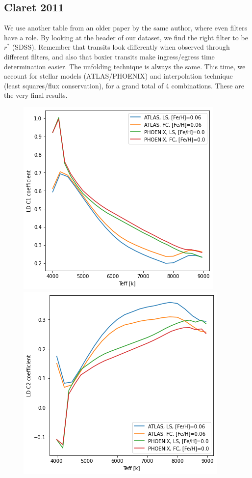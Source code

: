 \documentclass[a4paper,11pt,twocolumn]{article}
\begin{document}
\subsection{Claret 2011}
We use another table from an older paper by the same author, where even 
filters have a role. By looking at the header of our dataset, we find the 
right filter to be $r^{*}$ (SDSS). Remember that transits look differently 
when observed through different filters, and also that boxier transits make 
ingress/egress time determination easier. The unfolding technique is always 
the same.
This time, we account for stellar models (ATLAS/PHOENIX) and interpolation 
technique (least squares/flux conservation), for a grand total of 4 
combinations. These are the very final results.
\begin{figure}[H]
    \centering  
    \includegraphics[scale=0.35, angle=0]{../pictures/Claret2011/c1.png}
    \includegraphics[scale=0.35, angle=0]{../pictures/Claret2011/c2.png}

\end{figure}
\end{document}
